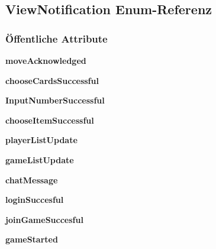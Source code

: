 \hypertarget{a00024}{\subsection{View\-Notification Enum-\/\-Referenz}
\label{a00024}
}
\subsubsection*{Öffentliche Attribute}
\begin{DoxyCompactItemize}
\item 
\hypertarget{a00024_a71398de7d7d0c05607093b90c17413bd}{{\bfseries move\-Acknowledged}}\label{a00024_a71398de7d7d0c05607093b90c17413bd}

\item 
\hypertarget{a00024_a0cee4c2ca533a7a49e94671b62b3ea9c}{{\bfseries choose\-Cards\-Successful}}\label{a00024_a0cee4c2ca533a7a49e94671b62b3ea9c}

\item 
\hypertarget{a00024_af9973716fdc25af45be6ce4725f3242d}{{\bfseries Input\-Number\-Successful}}\label{a00024_af9973716fdc25af45be6ce4725f3242d}

\item 
\hypertarget{a00024_a0ac1481b30289078afff8df2d8509e55}{{\bfseries choose\-Item\-Successful}}\label{a00024_a0ac1481b30289078afff8df2d8509e55}

\item 
\hypertarget{a00024_ab94d68b95b582b7cfb4b06c0601a8617}{{\bfseries player\-List\-Update}}\label{a00024_ab94d68b95b582b7cfb4b06c0601a8617}

\item 
\hypertarget{a00024_a52a96b472bb537904d3bad951bb106f5}{{\bfseries game\-List\-Update}}\label{a00024_a52a96b472bb537904d3bad951bb106f5}

\item 
\hypertarget{a00024_ab8055439fa39ac19535cc7eb48f3b528}{{\bfseries chat\-Message}}\label{a00024_ab8055439fa39ac19535cc7eb48f3b528}

\item 
\hypertarget{a00024_aa7d623b699d34c703cdb5a3bf507acc8}{{\bfseries login\-Succesful}}\label{a00024_aa7d623b699d34c703cdb5a3bf507acc8}

\item 
\hypertarget{a00024_a24ee2db83d9ed6d40f839bc235ae860f}{{\bfseries join\-Game\-Succesful}}\label{a00024_a24ee2db83d9ed6d40f839bc235ae860f}

\item 
\hypertarget{a00024_a900922a7746bade569a472e311a27cb7}{{\bfseries game\-Started}}\label{a00024_a900922a7746bade569a472e311a27cb7}


\end{DoxyCompactItemize}
